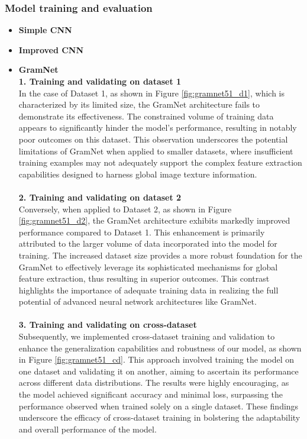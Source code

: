 \documentclass[rebuttal]{cvpr}
\begin{document}
\subsubsection{Model training and evaluation}
\begin{itemize}
        \item \textbf{Simple CNN} \\
        \item \textbf{Improved CNN} \\
        \item \textbf{GramNet} \\
         \textbf{1. Training and validating on dataset 1}  \\
            In the case of Dataset 1, as shown in Figure \ref{fig:gramnet51_d1}{}, which is characterized by its limited size, the GramNet architecture fails to demonstrate its effectiveness. The constrained volume of training data appears to significantly hinder the model's performance, resulting in notably poor outcomes on this dataset. This observation underscores the potential limitations of GramNet when applied to smaller datasets, where insufficient training examples may not adequately support the complex feature extraction capabilities designed to harness global image texture information.   
            \\
            \\
        \textbf{2. Training and validating on dataset 2}\\
           Conversely, when applied to Dataset 2, as shown in Figure \ref{fig:gramnet51_d2}, the GramNet architecture exhibits markedly improved performance compared to Dataset 1. This enhancement is primarily attributed to the larger volume of data incorporated into the model for training. The increased dataset size provides a more robust foundation for the GramNet to effectively leverage its sophisticated mechanisms for global feature extraction, thus resulting in superior outcomes. This contrast highlights the importance of adequate training data in realizing the full potential of advanced neural network architectures like GramNet.
            \\
            \\
        \textbf{3. Training and validating on cross-dataset} \\
            Subsequently, we implemented cross-dataset training and validation to enhance the generalization capabilities and robustness of our model, as shown in Figure \ref{fig:gramnet51_cd}. This approach involved training the model on one dataset and validating it on another, aiming to ascertain its performance across different data distributions. The results were highly encouraging, as the model achieved significant accuracy and minimal loss, surpassing the performance observed when trained solely on a single dataset. These findings underscore the efficacy of cross-dataset training in bolstering the adaptability and overall performance of the model.

\end{itemize}
\end{document}
